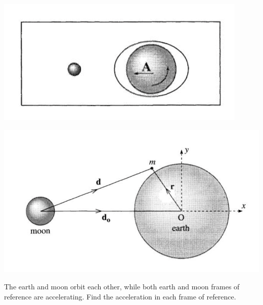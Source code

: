 \documentclass[../PHYS306Notes.tex]{subfiles}
\begin{document}
\begin{center}
    \includegraphics[scale=0.75]{Lecture-14/w14-img3.png}
\end{center}
\begin{center}
    \includegraphics[scale=0.75]{Lecture-14/w14-img4.png}
\end{center}
\begin{p}
The earth and moon orbit each other, while both earth and moon frames of reference are accelerating. Find the acceleration in each frame of reference. 
\end{p}
\end{document}
